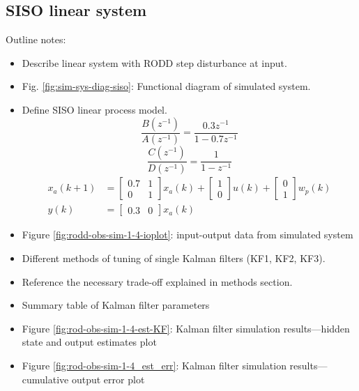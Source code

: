 \subsection{SISO linear system}

Outline notes:
\begin{itemize}
	\item Describe linear system with RODD step disturbance at input.
	\item Fig. \ref{fig:sim-sys-diag-siso}: Functional diagram of simulated system.
	\item Define SISO linear process model.
\begin{equation}
	\frac{B(z^{-1})}{A(z^{-1})} = \frac{0.3z^{-1}}{1-0.7z^{-1}}
\end{equation}
\begin{equation}
	\frac{C(z^{-1})}{D(z^{-1})} = \frac{1}{1-z^{-1}}
\end{equation}
\begin{equation}
	\begin{split}
	x_{a}(k+1) & =\left[\begin{array}{cc}
		0.7 & 1 \\
		0 & 1
	\end{array}\right] x_{a}(k)+\left[\begin{array}{l}
		1 \\
		0
	\end{array}\right] u(k)+\left[\begin{array}{l}
		0 \\
		1
	\end{array}\right] w_{p}(k) \\
	y(k) & =\left[\begin{array}{cc}
	0.3 & 0
\end{array}\right] x_{a}(k)
\end{split}
\end{equation}
	\item Figure \ref{fig:rodd-obs-sim-1-4-ioplot}: input-output data from simulated system
	\item Different methods of tuning of single Kalman filters (KF1, KF2, KF3).
	\item Reference the necessary trade-off explained in methods section.
	\item Summary table of Kalman filter parameters
	\item Figure \ref{fig:rod-obs-sim-1-4-est-KF}: Kalman filter simulation results—hidden state and output estimates plot
	\item Figure \ref{fig:rod-obs-sim-1-4_est_err}: Kalman filter simulation results—cumulative output error plot
\end{itemize}


